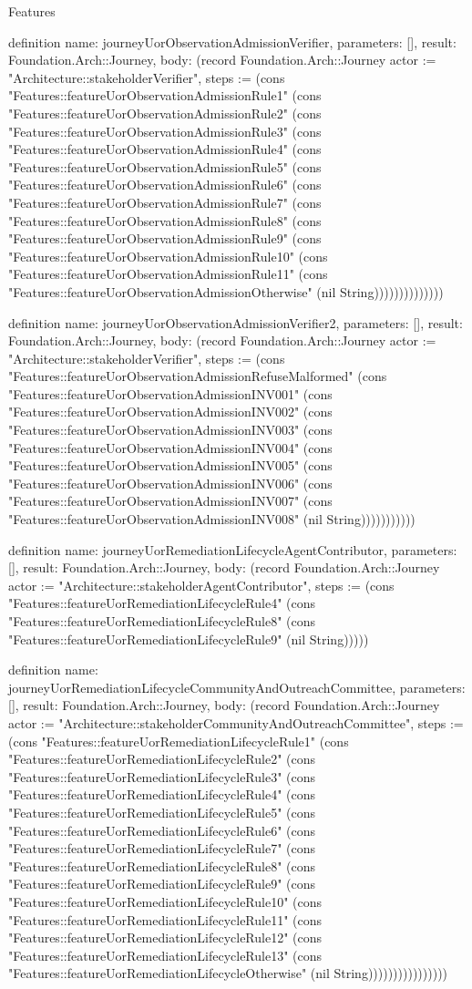 \begin{lexlean}{Features}
\begin{semanticmodule}
definition{
  name: journeyUorObservationAdmissionVerifier,
  parameters: [],
  result: Foundation.Arch::Journey,
  body: (record Foundation.Arch::Journey {actor := "Architecture::stakeholderVerifier", steps := (cons "Features::featureUorObservationAdmissionRule1" (cons "Features::featureUorObservationAdmissionRule2" (cons "Features::featureUorObservationAdmissionRule3" (cons "Features::featureUorObservationAdmissionRule4" (cons "Features::featureUorObservationAdmissionRule5" (cons "Features::featureUorObservationAdmissionRule6" (cons "Features::featureUorObservationAdmissionRule7" (cons "Features::featureUorObservationAdmissionRule8" (cons "Features::featureUorObservationAdmissionRule9" (cons "Features::featureUorObservationAdmissionRule10" (cons "Features::featureUorObservationAdmissionRule11" (cons "Features::featureUorObservationAdmissionOtherwise" (nil String)))))))))))))})
}

definition{
  name: journeyUorObservationAdmissionVerifier2,
  parameters: [],
  result: Foundation.Arch::Journey,
  body: (record Foundation.Arch::Journey {actor := "Architecture::stakeholderVerifier", steps := (cons "Features::featureUorObservationAdmissionRefuseMalformed" (cons "Features::featureUorObservationAdmissionINV001" (cons "Features::featureUorObservationAdmissionINV002" (cons "Features::featureUorObservationAdmissionINV003" (cons "Features::featureUorObservationAdmissionINV004" (cons "Features::featureUorObservationAdmissionINV005" (cons "Features::featureUorObservationAdmissionINV006" (cons "Features::featureUorObservationAdmissionINV007" (cons "Features::featureUorObservationAdmissionINV008" (nil String))))))))))})
}

definition{
  name: journeyUorRemediationLifecycleAgentContributor,
  parameters: [],
  result: Foundation.Arch::Journey,
  body: (record Foundation.Arch::Journey {actor := "Architecture::stakeholderAgentContributor", steps := (cons "Features::featureUorRemediationLifecycleRule4" (cons "Features::featureUorRemediationLifecycleRule8" (cons "Features::featureUorRemediationLifecycleRule9" (nil String))))})
}

definition{
  name: journeyUorRemediationLifecycleCommunityAndOutreachCommittee,
  parameters: [],
  result: Foundation.Arch::Journey,
  body: (record Foundation.Arch::Journey {actor := "Architecture::stakeholderCommunityAndOutreachCommittee", steps := (cons "Features::featureUorRemediationLifecycleRule1" (cons "Features::featureUorRemediationLifecycleRule2" (cons "Features::featureUorRemediationLifecycleRule3" (cons "Features::featureUorRemediationLifecycleRule4" (cons "Features::featureUorRemediationLifecycleRule5" (cons "Features::featureUorRemediationLifecycleRule6" (cons "Features::featureUorRemediationLifecycleRule7" (cons "Features::featureUorRemediationLifecycleRule8" (cons "Features::featureUorRemediationLifecycleRule9" (cons "Features::featureUorRemediationLifecycleRule10" (cons "Features::featureUorRemediationLifecycleRule11" (cons "Features::featureUorRemediationLifecycleRule12" (cons "Features::featureUorRemediationLifecycleRule13" (cons "Features::featureUorRemediationLifecycleOtherwise" (nil String)))))))))))))))})
}


\end{semanticmodule}
\end{lexlean}
